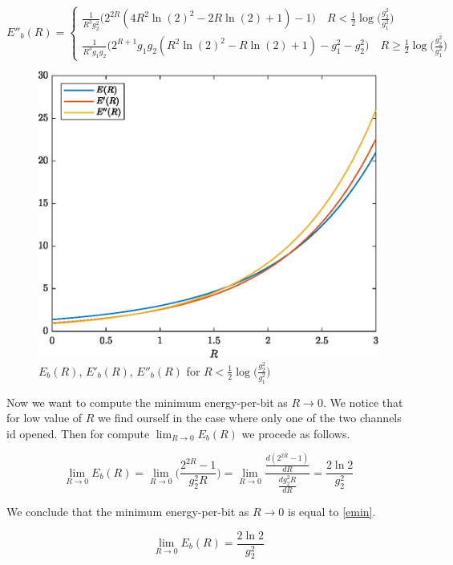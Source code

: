 \begin{equation}
	E''_b(R)= \begin{cases}
		\frac{1}{R^3g_2^2} \Big(2^{2R}(4R^2\ln(2)^2 -2R \ln(2)+1)-1\Big)  \quad R < \frac{1}{2} \log\Big(\frac{g_2^2}{g_1^2}\Big) \\
		\frac{1}{R^3 g_1 g_2} \Big( 2^{R+1} g_1 g_2 ( R^2 \ln(2)^2 - R \ln(2) +1 ) -g_1^2 -g_2^2 \Big) \quad R \geq \frac{1}{2} \log\Big(\frac{g_2^2}{g_1^2}\Big)

\end{cases}
\end{equation}

\begin{figure}[h!]
	\centering
	\includegraphics[width=0.7\linewidth]{img/energy_per_bit_1.eps}
	\caption{$E_b(R)$, $E'_b(R)$, $E''_b(R)$ for $R < \frac{1}{2} \log\Big(\frac{g_2^2}{g_1^2}\Big)$ }
	\label{fig:funcex2}
\end{figure}


Now we want to compute the minimum energy-per-bit as $R \rightarrow 0$. We notice that for low value of $R$ we find ourself in the case where only one of the two channels id opened. Then for compute $\lim_{R \rightarrow 0} E_b(R)$ we procede as follows.

\begin{equation}
	\lim_{R \rightarrow 0} E_b(R) =
		\lim_{R \rightarrow 0} \Big(\frac{2^{2R}-1}{g_2^2 R}\Big) = \lim_{R \rightarrow 0} \frac{ \frac{d(2^{2R}-1)}{dR}} {\frac{dg_2^2 R}{dR}}=\frac{2\ln{2}}{g_2^2}
\end{equation}

We conclude that the minimum energy-per-bit as $R \rightarrow 0$ is equal to \eqref{emin}.

\begin{equation}
	\lim_{R \rightarrow 0} E_b(R) =
		\frac{2\ln{2}}{g_2^2}
\label{emin}
\end{equation}
